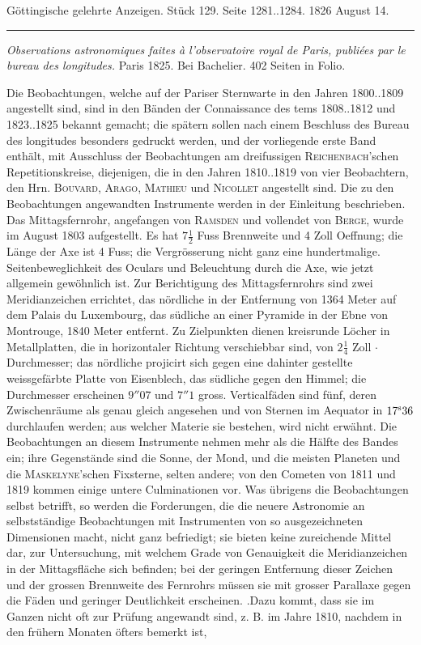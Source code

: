 \par\bigskip
\hypertarget{native-646-lower}{}
\begin{center}\small Göttingische gelehrte Anzeigen. Stück 129. Seite 1281..1284. 1826 August 14.\\[3pt]\rule{.72\linewidth}{.3pt}\end{center}

\emph{Observations astronomiques faites à l'observatoire royal de Paris, publiées par le bureau des longitudes.} Paris 1825. Bei Bachelier. 402 Seiten in Folio.

Die Beobachtungen, welche auf der Pariser Sternwarte in den Jahren 1800..1809 angestellt sind, sind in den Bänden der Connaissance des tems 1808..1812 und 1823..1825 bekannt gemacht; die spätern sollen nach einem Beschluss des Bureau des longitudes besonders gedruckt werden, und der vorliegende erste Band enthält, mit Ausschluss der Beobachtungen am dreifussigen \textsc{Reichenbach}'schen Repetitionskreise, diejenigen, die in den Jahren 1810..1819 von vier Beobachtern, den Hrn. \textsc{Bouvard}, \textsc{Arago}, \textsc{Mathieu} und \textsc{Nicollet} angestellt sind. Die zu den Beobachtungen angewandten Instrumente werden in der Einleitung beschrieben. Das Mittagsfernrohr, angefangen von \textsc{Ramsden} und vollendet von \textsc{Berge}, wurde im August 1803 aufgestellt. Es hat $7\frac{1}{2}$ Fuss Brennweite und 4 Zoll Oeffnung; die Länge der Axe ist 4 Fuss; die Vergrösserung nicht ganz eine hundertmalige. Seitenbeweglichkeit des Oculars und Beleuchtung durch die Axe, wie jetzt allgemein gewöhnlich ist. Zur Berichtigung des Mittagsfernrohrs sind zwei Meridianzeichen errichtet, das nördliche in der Entfernung von 1364 Meter auf dem Palais du Luxembourg, das südliche an einer Pyramide in der Ebne von Montrouge, 1840 Meter entfernt. Zu Zielpunkten dienen kreisrunde Löcher in Metallplatten, die in horizontaler Richtung verschiebbar sind, von $2\frac{1}{4}$ Zoll $\cdot$ Durchmesser; das nördliche projicirt sich gegen eine dahinter gestellte weissgefärbte Platte von Eisenblech, das südliche gegen den Himmel; die Durchmesser erscheinen $9''07$ und $7''1$ gross. Verticalfäden sind fünf, deren Zwischenräume als genau gleich angesehen und von Sternen im Aequator in $17^{\rm s}36$ durchlaufen werden; aus welcher Materie sie bestehen, wird nicht erwähnt. Die Beobachtungen an diesem Instrumente nehmen mehr als die Hälfte des Bandes ein; ihre Gegenstände sind die Sonne, der Mond, und die meisten Planeten und die \textsc{Maskelyne}'schen Fixsterne, selten andere; von den Cometen von 1811 und 1819 kommen einige untere Culminationen vor. Was übrigens die Beobachtungen selbst betrifft, so werden die Forderungen, die die neuere Astronomie an selbstständige Beobachtungen mit Instrumenten von so ausgezeichneten Dimensionen macht, nicht ganz befriedigt; sie bieten keine zureichende Mittel dar, zur Untersuchung, mit welchem Grade von Genauigkeit die Meridianzeichen in der Mittagsfläche sich befinden; bei der geringen Entfernung dieser Zeichen und der grossen Brennweite des Fernrohrs müssen sie mit grosser Parallaxe gegen die Fäden und geringer Deutlichkeit erscheinen. .Dazu kommt, dass sie im Ganzen nicht oft zur Prüfung angewandt sind, z. B. im Jahre 1810, nachdem in den frühern Monaten öfters bemerkt ist, 